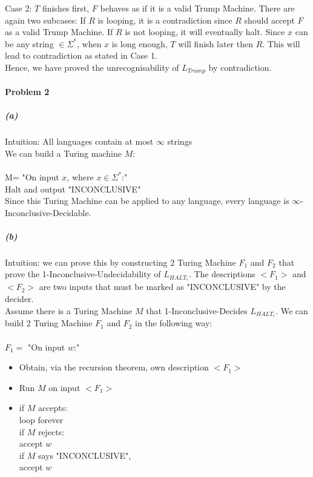 \documentclass[11pt]{article}
\newcommand\tab[1][1cm]{\hspace*{#1}}
\begin{document}
Case 2: $T$ finishes first, $F$ behaves as if it is a valid Trump Machine. There are again two subcases: If $R$ is looping, it is a contradiction since $R$ should accept $F$ as a valid Trump Machine. If $R$ is not looping, it will eventually halt. Since $x$ can be any string $\in \Sigma^*$, when $x$ is long enough, $T$ will finish later then $R$. This will lead to contradiction as stated in Case 1. \\

Hence, we have proved the unrecognisability of $L_{Trump}$ by contradiction. \\
\newpage
\paragraph{Problem 2}
\subparagraph{(a)}
Intuition: All languages contain at most $\infty$ strings \\

We can build a Turing machine $M$:\\~\\
M= "On input $x$, where $x \in \Sigma^*$:" \\
\tab Halt and output "INCONCLUSIVE" \\

Since this Turing Machine can be applied to any language, every language is $\infty$-Inconclusive-Decidable.


\subparagraph{(b)}
Intuition: we can prove this by constructing 2 Turing Machine $F_1$ and $F_2$ that prove the 1-Inconclusive-Undecidability of $L_{{HALT}_{\epsilon}}$. The descriptions $<F_1>$ and $<F_2>$ are two inputs that must be marked as "INCONCLUSIVE" by the decider.  \\

Assume there is a Turing Machine $M$ that 1-Inconclusive-Decides $L_{{HALT}_{\epsilon}}$. We can build 2 Turing Machine $F_1$ and $F_2$ in the following way: \\~\\
$F_1=$ "On input $w$:" 
\begin{itemize}
\item Obtain, via the recursion theorem, own description $<F_1>$ 
\item  Run $M$ on input $<F_1>$ 
\item if $M$ accepts: \\
\tab loop forever \\
if $M$ rejects: \\
\tab accept $w$ \\
if $M$ says "INCONCLUSIVE", \\
\tab accept $w$
\end{itemize}
\end{document}

